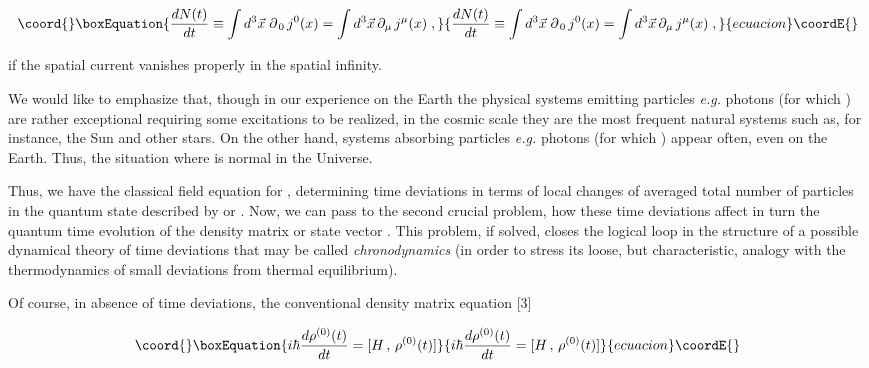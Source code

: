 \documentclass[a4paper,12pt]{article}
\begin{document}
\begin{equation}\coord{}\boxEquation{
\frac{d N(t)}{dt} \equiv \int d^3\vec{x}\; \partial_{\,0}\, j^0(x) = \int d^3\vec{x}\,\partial_\mu\, j^\mu(x)\;, 
}{
\frac{d N(t)}{dt} \equiv \int d^3\vec{x}\; \partial_{\,0}\, j^0(x) = \int d^3\vec{x}\,\partial_\mu\, j^\mu(x)\;, 
}{ecuacion}\coordE{}\end{equation}

\ni if the spatial current \coordHE{} vanishes properly in the spatial infinity.

We would like to emphasize that, though in our experience on the Earth the physical systems emitting particles {\it e.g.} photons (for which \coordHE{}) are rather exceptional requiring some excitations to be realized, in the cosmic scale they are the most frequent natural systems such as, for instance,  the Sun and other stars. On the other hand, systems absorbing particles {\it e.g.} photons (for which \coordHE{}) appear often, even on the Earth. Thus, the situation where \coordHE{} is normal in the Universe.

\vspace{0.2cm}


\vspace{0.2cm}

Thus, we have the classical field equation for \coordHE{}, determining time deviations in terms of local changes of averaged total number of particles in the quantum state described by \coordHE{} or \coordHE{}. Now, we can pass to the second crucial problem, how these time deviations affect in turn the quantum time evolution of the density matrix \coordHE{} or state vector \coordHE{}. This problem, if solved, closes the logical loop in the structure of a possible dynamical theory of time deviations that may be called {\it chronodynamics} (in order to stress its loose, but characteristic, analogy with the thermodynamics of small deviations from thermal equilibrium).

Of course, in absence of time deviations, the conventional density matrix equation [3]

\begin{equation}\coord{}\boxEquation{
i \hbar \frac{d\rho^{(0)}(t)}{dt} = [H\,,\,\rho^{(0)}(t)]
}{
i \hbar \frac{d\rho^{(0)}(t)}{dt} = [H\,,\,\rho^{(0)}(t)]
}{ecuacion}\coordE{}\end{equation}
\end{document}
